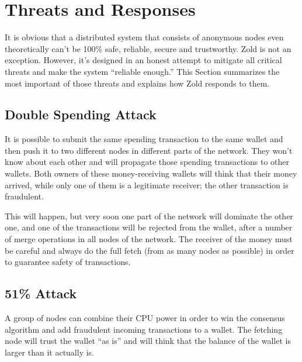 \documentclass{main}
\begin{document}
\section{Threats and Responses}\label{sec:threats}

It is obvious that a distributed system that consists of anonymous nodes
even theoretically can't be 100\% safe, reliable, secure and trustworthy.
Zold is not an exception. However, it's designed in an honest attempt
to mitigate all critical threats and make the system ``reliable enough.''
This Section summarizes the most important of those threats and explains
how Zold responds to them.

\subsection{Double Spending Attack}

It is possible to submit the same spending transaction to the same wallet
and then push it to two different nodes in different parts of the network.
They won't know about each other and will propagate those spending
transactions to other wallets. Both owners of these money-receiving
wallets will think that their money arrived, while only one of them is
a legitimate receiver; the other transaction is fraudulent.

This will happen, but very soon one part of the network will dominate the other
one, and one of the transactions will be rejected from the wallet, after
a number of merge operations in all nodes of the network. The receiver of the
money must be careful and always do the full fetch (from as many nodes
as possible) in order to guarantee safety of transactions.

\subsection{51\% Attack}

A group of nodes can combine their CPU power in order to win the consensus
algorithm and add fraudulent incoming transactions to a wallet.
The fetching node will trust the wallet ``as is'' and will think that the
balance of the wallet is larger than it actually is.
\end{document}
